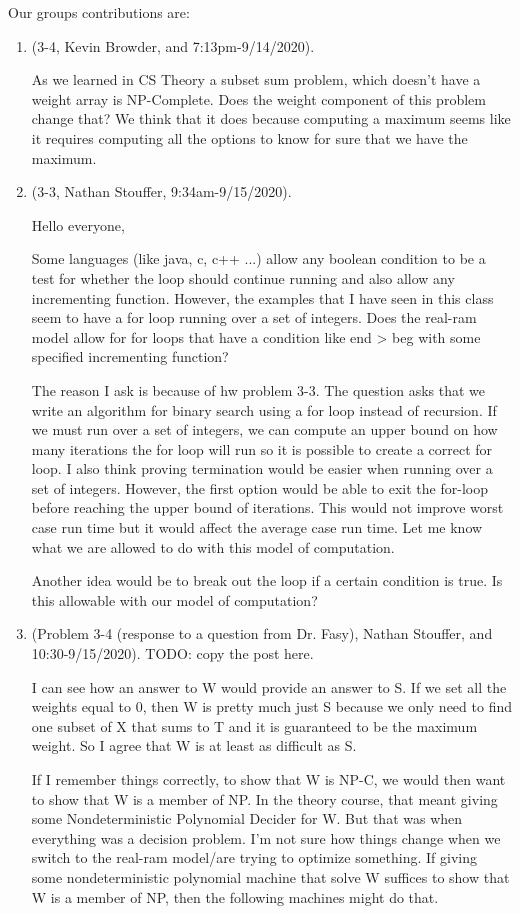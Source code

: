 \documentclass{article}
\begin{document}
Our groups contributions are:
\begin{enumerate}
    \item (3-4, Kevin Browder, and 7:13pm-9/14/2020).

    As we learned in CS Theory a subset sum problem, which doesn't have a weight array is NP-Complete. Does the weight component of this problem change that? We think that it does because computing a maximum seems like it requires computing all the options to know for sure that we have the maximum.
    \item (3-3, Nathan Stouffer, 9:34am-9/15/2020).

    Hello everyone,

    Some languages (like java, c, c++ ...) allow any boolean condition to be a test for whether the loop should continue running and also allow any incrementing function. However, the examples that I have seen in this class seem to have a for loop running over a set of integers. Does the real-ram model allow for for loops that have a condition like end > beg with some specified incrementing function?

    The reason I ask is because of hw problem 3-3. The question asks that we write an algorithm for binary search using a for loop instead of recursion. If we must run over a set of integers, we can compute an upper bound on how many iterations the for loop will run so it is possible to create a correct for loop. I also think proving termination would be easier when running over a set of integers. However, the first option would be able to exit the for-loop before reaching the upper bound of iterations. This would not improve worst case run time but it would affect the average case run time. Let me know what we are allowed to do with this model of computation.

    Another idea would be to break out the loop if a certain condition is true. Is this allowable with our model of computation?

    \item (Problem 3-4 (response to a question from Dr. Fasy), Nathan Stouffer, and 10:30-9/15/2020). TODO:
        copy the post here.

        I can see how an answer to W would provide an answer to S. If we set all the weights equal to 0, then W is pretty much just S because we only need to find one subset of X that sums to T and it is guaranteed to be the maximum weight. So I agree that W is at least as difficult as S.

        If I remember things correctly, to show that W is NP-C, we would then want to show that W is a member of NP. In the theory course, that meant giving some Nondeterministic Polynomial Decider for W. But that was when everything was a decision problem. I'm not sure how things change when we switch to the real-ram model/are trying to optimize something. If giving some nondeterministic polynomial machine that solve W suffices to show that W is a member of NP, then the following machines might do that. \\


\end{enumerate}
\end{document}
